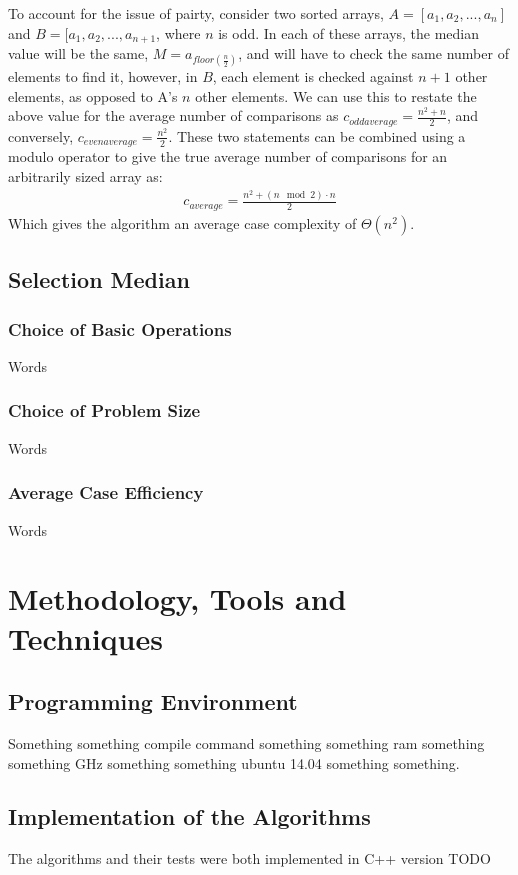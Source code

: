 \documentclass{article}
\begin{document}
            To account for the issue of pairty, consider two sorted arrays, $A = [a_1, a_2, ..., a_n]$ and $B = [a_1, a_2, ..., a_{n+1}$, where $n$ is odd. In each of these arrays, the median value will be the same, $M = a_{floor(\frac{n}{2})}$, and will have to check the same number of elements to find it, however, in $B$, each element is checked against $n + 1$ other elements, as opposed to A's $n$ other elements. We can use this to restate the above value for the average number of comparisons as $c_{odd average} = \frac{n^2 + n}{2}$, and conversely, $c_{even average} = \frac{n^2}{2}$. These two statements can be combined using a modulo operator to give the true average number of comparisons for an arbitrarily sized array as:
            \begin{align}
                c_{average} = \frac{n^2 + (n\mod 2) \cdot n}{2}
            \end{align}
            Which gives the algorithm an average case complexity of $\Theta(n^2)$.
    \subsection{Selection Median}
        \subsubsection{Choice of Basic Operations}
            Words
        \subsubsection{Choice of Problem Size}
            Words
        \subsubsection{Average Case Efficiency}
            Words

\section{Methodology, Tools and Techniques}
    \subsection{Programming Environment}
        Something something compile command something something ram something something GHz something something ubuntu 14.04 something something.
    \subsection{Implementation of the Algorithms}
        The algorithms and their tests were both implemented in C++ version TODO
\end{document}
